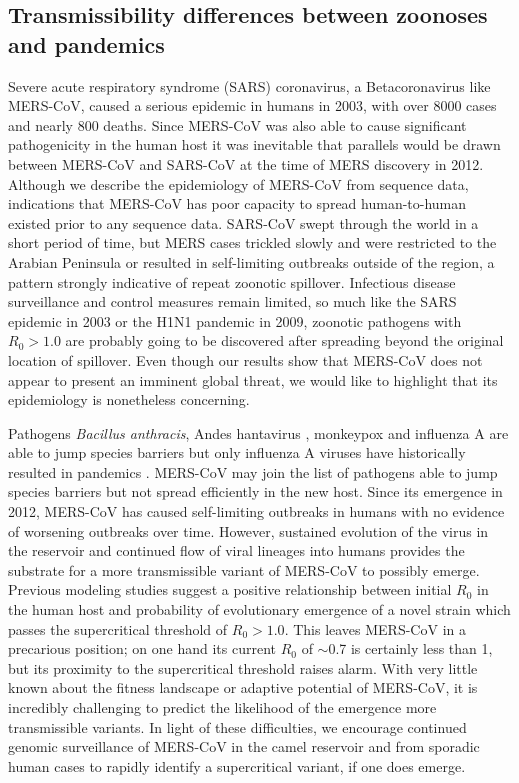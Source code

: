 \documentclass[9pt,lineno]{elife}
\begin{document}
\subsection*{Transmissibility differences between zoonoses and pandemics}
Severe acute respiratory syndrome (SARS) coronavirus, a Betacoronavirus like MERS-CoV, caused a serious epidemic in humans in 2003, with over 8000 cases and nearly 800 deaths.
Since MERS-CoV was also able to cause significant pathogenicity in the human host it was inevitable that parallels would be drawn between MERS-CoV and SARS-CoV at the time of MERS discovery in 2012.
Although we describe the epidemiology of MERS-CoV from sequence data, indications that MERS-CoV has poor capacity to spread human-to-human existed prior to any sequence data.
SARS-CoV swept through the world in a short period of time, but MERS cases trickled slowly and were restricted to the Arabian Peninsula or resulted in self-limiting outbreaks outside of the region, a pattern strongly indicative of repeat zoonotic spillover.
Infectious disease surveillance and control measures remain limited, so much like the SARS epidemic in 2003 or the H1N1 pandemic in 2009, zoonotic pathogens with $R_{0}>1.0$ are probably going to be discovered after spreading beyond the original location of spillover.
Even though our results show that MERS-CoV does not appear to present an imminent global threat, we would like to highlight that its epidemiology is nonetheless concerning.

Pathogens \textit{Bacillus anthracis}, Andes hantavirus \citep{martinez_person--person_2005}, monkeypox \citep{reed_detection_2004} and influenza A are able to jump species barriers but only influenza A viruses have historically resulted in pandemics \citep{lipsitch_viral_2016}.
MERS-CoV may join the list of pathogens able to jump species barriers but not spread efficiently in the new host.
Since its emergence in 2012, MERS-CoV has caused self-limiting outbreaks in humans with no evidence of worsening outbreaks over time.
However, sustained evolution of the virus in the reservoir and continued flow of viral lineages into humans provides the substrate for a more transmissible variant of MERS-CoV to possibly emerge.
Previous modeling studies \citep{antia_role_2003, park_multiple_2013} suggest a positive relationship between initial $R_{0}$ in the human host and probability of evolutionary emergence of a novel strain which passes the supercritical threshold of $R_{0}>1.0$.
This leaves MERS-CoV in a precarious position; on one hand its current $R_{0}$ of $\sim$0.7 is certainly less than 1, but its proximity to the supercritical threshold raises alarm.
With very little known about the fitness landscape or adaptive potential of MERS-CoV, it is incredibly challenging to predict the likelihood of the emergence more transmissible variants.
In light of these difficulties, we encourage continued genomic surveillance of MERS-CoV in the camel reservoir and from sporadic human cases to rapidly identify a supercritical variant, if one does emerge.
\end{document}
